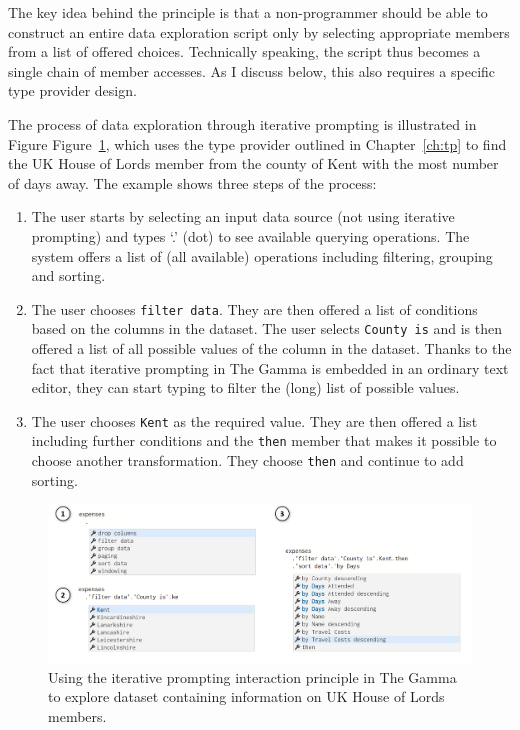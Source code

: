 \documentclass[fleqn,11pt]{report}
\theoremstyle{definition}
\newenvironment{nenumerate}
{ \vspace{-0.4em}
  \begin{enumerate}
    \setlength{\itemsep}{5pt}
    \setlength{\parskip}{0pt}
    \setlength{\parsep}{0pt} }
{ \end{enumerate}
  \vspace{-0.4em} }
\begin{document}
The key idea behind the principle is that a non-programmer should be able to construct
an entire data exploration script only by selecting appropriate members from a list of
offered choices. Technically speaking, the script thus becomes a single chain of member
accesses. As I discuss below, this also requires a specific type provider design.

The process of data exploration through iterative prompting is illustrated in Figure
Figure~\ref{fig:iterative}, which uses the type provider outlined in Chapter~\ref{ch:tp} to
find the UK House of Lords member from the county of Kent with the most number of days away.
The example shows three steps of the process:

\begin{nenumerate}
\item The user starts by selecting an input data source (not using iterative prompting)
  and types `.' (dot) to see available querying operations. The system offers a list of
  (all available) operations including filtering, grouping and sorting.

\item The user chooses \texttt{filter data}. They are then offered a list of conditions
  based on the columns in the dataset. The user selects \texttt{County is} and is then
  offered a list of all possible values of the column in the dataset. Thanks to the fact
  that iterative prompting in The Gamma is embedded in an ordinary text editor, they
  can start typing to filter the (long) list of possible values.

\item The user chooses \texttt{Kent} as the required value. They are then offered a list
  including further conditions and the \texttt{then} member that makes it possible to choose
  another transformation. They choose \texttt{then} and continue to add sorting.
\end{nenumerate}

\begin{figure}[t]
\hspace{-2em}
\includegraphics[scale=0.45]{img/iterative.png}
\caption{Using the iterative prompting interaction principle in The Gamma to explore
dataset containing information on UK House of Lords members.}
\label{fig:iterative}
\end{figure}
\end{document}
